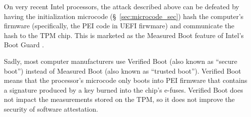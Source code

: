 On very recent Intel processors, the attack described above can be defeated by
having the initialization microcode (\S~\ref{sec:microcode_sec}) hash the
computer's firmware (specifically, the PEI code in UEFI \cite{forum2015uefi}
firwmare) and communicate the hash to the TPM chip. This is marketed as the
Measured Boot feature of Intel's Boot Guard \cite{ruan2014intelme}.

Sadly, most computer manufacturers use Verified Boot (also known as ``secure
boot'') instead of Measured Boot (also known as ``trusted boot''). Verified
Boot means that the processor's microcode only boots into PEI firmware that
contains a signature produced by a key burned into the chip's e-fuses. Verified
Boot does not impact the measurements stored on the TPM, so it does not improve
the security of software attestation.
